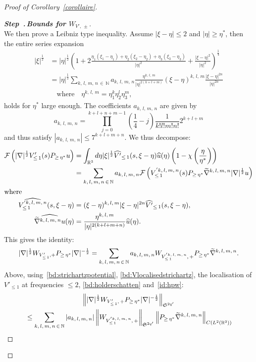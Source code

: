 \documentclass[10pt]{amsart}
\theoremstyle{definition}\newtheorem{defi}[theo]{Definition}\newtheorem{rema}[theo]{Remark}\newtheorem{exam}[theo]{Example}\newtheorem{exem}[theo]{Example}\newtheorem{nota}[theo]{Notation}
\newcommand{\R}{\mathbb{R}}
\newcommand{\N}{\mathbb{N}}
\newcommand{\mclF}{\mathcal{F}}
\newcommand{\frkS}{\mathfrak{S}}
\newcounter{stepcount}
\newenvironment{step}[1]{\refstepcounter{stepcount}\begin{proof}[{\bf{Step~\thestepcount}{.\,\emph{#1}}}]}{\let\qed\relax\end{proof}}
\let\oldtilde\tilde
\renewcommand*{\tilde}[1]{\mathchoice{\widetilde{#1}}{\widetilde{#1}}{\oldtilde{#1}}{\oldtilde{#1}}}
\let\oldhat\hat
\renewcommand*{\hat}[1]{\mathchoice{\widehat{#1}}{\widehat{#1}}{\oldhat{#1}}{\oldhat{#1}}}
\begin{document}
\begin{proof}[Proof of Corollary~\ref{corollaire}]
\begin{step}{{Bounds for $W_{V',\,\pm}$}}
\[\]
We then prove a Leibniz type inequality. Assume $|\xi-\eta|\leq 2$ and $|\eta|\geq \eta^*$, then the entire series expansion
\begin{align*}
|\xi|^{\frac 12} &=|\eta|^{\frac 12}\left(1+2\frac{\eta_1(\xi_1-\eta_1)+\eta_2(\xi_2-\eta_2)+\eta_3(\xi_3-\eta_3)}{|\eta|^2}+\frac{|\xi-\eta|^2}{|\eta|^2}\right)^{\frac 14}\\
& =|\eta|^{\frac 12}\sum_{k,\,l,\,m,\,n\,\in\,\N}a_{k,\,l,\,m,\,n} \frac{\eta^{k,\,l,\,m}}{|\eta|^{2(k+l+m)}}(\xi-\eta)^{k,\,l,\,m} \frac{|\xi-\eta|^{2n}}{|\eta|^{2n}}\\
&\quad\text{where}\quad \eta^{k,\,l,\,m}=\eta_1^k\eta_2^l\eta_3^m,
\end{align*}
holds for $\eta^*$ large enough. The coefficients $a_{k,\,l,\,m,\,n}$ are given by
\[
a_{k,\,l,\,m,\,n} = \prod_{j=0}^{k+l+n+m-1} \left(\frac14 -j\right) \frac1{k!l!m!n!} 2^{k+l+m}
\]
and thus satisfy $|a_{k,\,l,\,m,\,n}|\leq 7^{k+l+m+n}$. We thus decompose:
\begin{align*}
\mclF\left(|\nabla|^{\frac 12} V'_{\leq\,1}(s)P_{\geq\, \eta^*}u \right) & = \int_{\R^3}d\eta |\xi|^{\frac 12} \widehat{ V'}_{\leq\,1}(s,\xi-\eta)\hat u(\eta) \left(1-\chi\left(\frac{\eta}{\eta^*}\right)\right) \\
&= \sum_{k,\,l,\,m,\,n\,\in\,\N} a_{k,\,l,\,m,\,n} \mclF\left(V^{'k,\,l,\,m,\,n}_{\leq\,1}(s) P_{\geq\, \eta^*} \tilde \nabla^{k,\,l,\,m,\,n} |\nabla|^{\frac 12}u \right)
\\
\intertext{where}
\widehat{V^{'k,\,l,\,m,\,n}_{\leq\,1}}(s,\xi-\eta) &=(\xi-\eta)^{k,\,l,\,m}|\xi-\eta|^{2n}\widehat{V'}_{\leq\,1}(s,\xi-\eta), \\
 \widehat{\tilde \nabla^{k,\,l,\,m,\,n}u}(\eta) &=\frac{\eta^{k,\,l,\,m}}{|\eta|^{2(k+l+m+n)}}\hat u(\eta).
\end{align*}
This gives the identity:
\[
|\nabla |^{\frac 12}W_{V'_{\leq\,1},+}P_{\geq\,\eta^*} |\nabla |^{-\frac 12} =\sum_{k,\,l,\,m,\,n\,\in\,\N}a_{k,\,l,\,m,\,n} W_{V^{'k,\,l,\,m,\,n}_{\leq\,1},\,+}P_{\geq\,\eta^*} \tilde \nabla^{k,\,l,\,m,\,n}.
\]
Above, using~\eqref{bd:strichartzpotential}, \eqref{bd:Vlocalisedstrichartz}, the localisation of $V'_{\leq 1}$ at frequencies $\leq 2$, \eqref{bd:holderschatten} and~\eqref{id:hpw}:
\begin{multline}\label{bc:interWV3}
\left \| |\nabla |^{\frac 12}W_{V'_{\leq\,1},\,+}P_{\geq\,\eta^*} |\nabla |^{-\frac 12}\right\|_{\frkS^{2q'}}\\
\begin{aligned} 
&\leq \sum_{k,\,l,\,m,\,n\,\in\,\N} \left|a_{k,\,l,\,m,\,n}\right| \left\| W_{V^{'k,\,l,\,m,\,n}_{\leq\,1},\,+}\right\|_{\frkS^{2q'}} \left\| P_{\geq\,\eta^*} \tilde \nabla^{k,\,l,\,m,\,n}\right\|_{C\left(L^2\left(\R^3\right)\right)}\\

\end{aligned}
\end{multline}
\end{step}
\end{proof}
\end{document}
